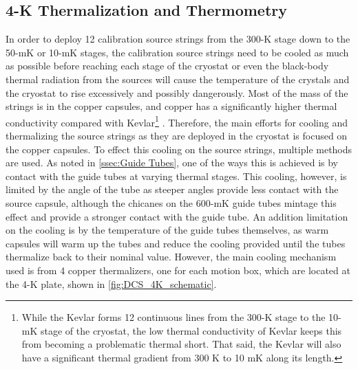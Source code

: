 \subsection*{4-K Thermalization and Thermometry}
\label{ssec:Thermalization_and_Thermometry}
In order to deploy 12 calibration source strings from the 300-K stage down to the 50-mK or 10-mK stages, the calibration source strings need to be cooled as much as possible before reaching each stage of the cryostat or even the black-body thermal radiation from the sources will cause the temperature of the crystals and the cryostat to rise excessively and possibly dangerously.
Most of the mass of the strings is in the copper capsules, and copper has a significantly higher thermal conductivity compared with Kevlar\footnote{While the Kevlar forms 12 continuous lines from the 300-K stage to the 10-mK stage of the cryostat, the low thermal conductivity of Kevlar keeps this from becoming a problematic thermal short.
That said, the Kevlar will also have a significant thermal gradient from 300 K to 10 mK along its length.} \cite{Cu_thermal_conductivity, VENTURA2009735}.
Therefore, the main efforts for cooling and thermalizing the source strings as they are deployed in the cryostat is focused on the copper capsules.
To effect this cooling on the source strings, multiple methods are used. 
As noted in \autoref{ssec:Guide Tubes}, one of the ways this is achieved is by contact with the guide tubes at varying thermal stages.
This cooling, however, is limited by the angle of the tube as steeper angles provide less contact with the source capsule, although the chicanes on the 600-mK guide tubes mintage this effect and provide a stronger contact with the guide tube.
An addition limitation on the cooling is by the temperature of the guide tubes themselves, as warm capsules will warm up the tubes and reduce the cooling provided until the tubes thermalize back to their nominal value.
However, the main cooling mechanism used is from 4 copper thermalizers, one for each motion box, which are located at the 4-K plate, shown in \autoref{fig:DCS_4K_schematic}.

